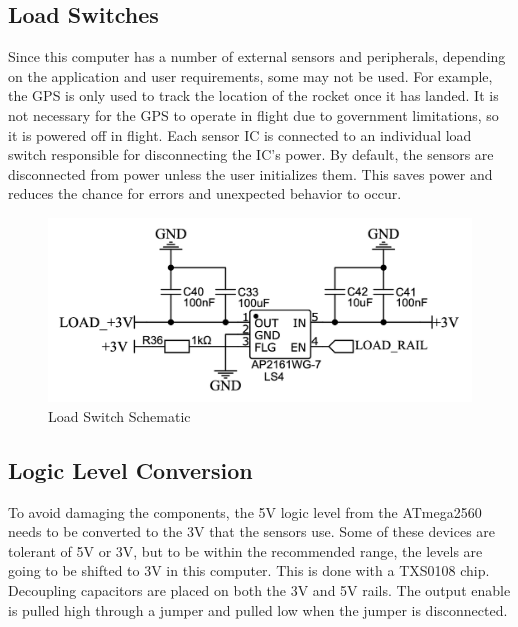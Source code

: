 \documentclass[conf]{new-aiaa}
\begin{document}
\subsection{Load Switches}

Since this computer has a number of external sensors and peripherals, depending on the application and user requirements, some may not be used. For example, the GPS is only used to track the location of the rocket once it has landed. It is not necessary for the GPS to operate in flight due to government limitations\cite{l76}, so it is powered off in flight. Each sensor IC is connected to an individual load switch responsible for disconnecting the IC's power. By default, the sensors are disconnected from power unless the user initializes them. This saves power and reduces the chance for errors and unexpected behavior to occur.

\begin{figure}[H]
    \centering
    \includegraphics[scale=0.25]{loadsw_schematic.png}
    \caption{Load Switch Schematic}
    \label{fig:loadsw_schematic}
\end{figure}

\pagebreak
\subsection{Logic Level Conversion}

To avoid damaging the components, the 5V logic level from the ATmega2560\cite{atmega2560} needs to be converted to the 3V that the sensors use. Some of these devices are tolerant of 5V or 3V, but to be within the recommended range, the levels are going to be shifted to 3V in this computer. This is done with a TXS0108 chip\cite{txs0108}. Decoupling capacitors are placed on both the 3V and 5V rails. The output enable is pulled high through a jumper and pulled low when the jumper is disconnected.
\end{document}
